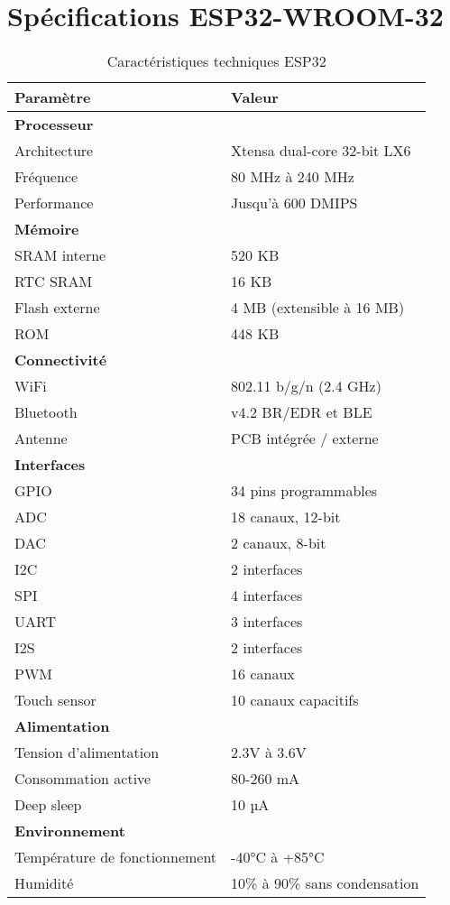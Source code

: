 
\section{Spécifications ESP32-WROOM-32}

\begin{table}[h]
\centering
\caption{Caractéristiques techniques ESP32}
\begin{tabular}{ll}
\toprule
\textbf{Paramètre} & \textbf{Valeur} \\
\midrule
\multicolumn{2}{l}{\textbf{Processeur}} \\
Architecture & Xtensa dual-core 32-bit LX6 \\
Fréquence & 80 MHz à 240 MHz \\
Performance & Jusqu'à 600 DMIPS \\
\midrule
\multicolumn{2}{l}{\textbf{Mémoire}} \\
SRAM interne & 520 KB \\
RTC SRAM & 16 KB \\
Flash externe & 4 MB (extensible à 16 MB) \\
ROM & 448 KB \\
\midrule
\multicolumn{2}{l}{\textbf{Connectivité}} \\
WiFi & 802.11 b/g/n (2.4 GHz) \\
Bluetooth & v4.2 BR/EDR et BLE \\
Antenne & PCB intégrée / externe \\
\midrule
\multicolumn{2}{l}{\textbf{Interfaces}} \\
GPIO & 34 pins programmables \\
ADC & 18 canaux, 12-bit \\
DAC & 2 canaux, 8-bit \\
I2C & 2 interfaces \\
SPI & 4 interfaces \\
UART & 3 interfaces \\
I2S & 2 interfaces \\
PWM & 16 canaux \\
Touch sensor & 10 canaux capacitifs \\
\midrule
\multicolumn{2}{l}{\textbf{Alimentation}} \\
Tension d'alimentation & 2.3V à 3.6V \\
Consommation active & 80-260 mA \\
Deep sleep & 10 µA \\
\midrule
\multicolumn{2}{l}{\textbf{Environnement}} \\
Température de fonctionnement & -40°C à +85°C \\
Humidité & 10\% à 90\% sans condensation \\
\bottomrule
\end{tabular}
\end{table}

